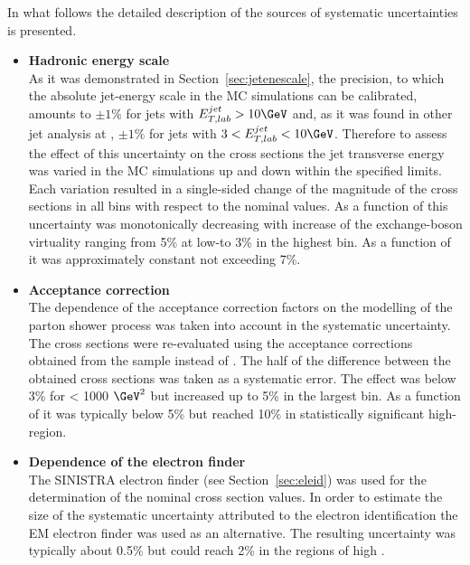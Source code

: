 In what follows the detailed description of the sources of systematic uncertainties is presented.
\begin{itemize}
	\item \textbf{Hadronic energy scale} \\
		As it was demonstrated in Section~\ref{sec:jetenescale}, the precision, to which the absolute jet-energy scale in the MC simulations can be calibrated, amounts to $\pm1\%$ for jets with $\etjetlab > 10 \GeV$ and, as it was found in other jet analysis at \zeus, $\pm1\%$ for jets with $3 < \etjetlab < 10 \GeV$. Therefore to assess the effect of this uncertainty on the cross sections the jet transverse energy was varied in the MC simulations up and down within the specified limits. Each variation resulted in a single-sided change of the magnitude of the cross sections in all bins with respect to the nominal values. As a function of \qsq this uncertainty was monotonically decreasing with increase of the exchange-boson virtuality ranging from 5\% at low-\qsq to 3\% in the highest \qsq bin. As a function of \etjetb it was approximately constant not exceeding 7\%.
		
	\item \textbf{Acceptance correction} \\
		The dependence of the acceptance correction factors on the modelling of the parton shower process was taken into account in the systematic uncertainty. The cross sections were re-evaluated using the acceptance corrections obtained from the \ariadne sample instead of \lepto. The half of the difference between the obtained cross sections was taken as a systematic error. The effect was below 3\% for \qsq < 1000 $\GeV^2$ but increased up to 5\% in the largest \qsq bin. As a function of \etjetb it was typically below 5\% but reached 10\% in statistically significant high-\etjetb region.
			
	\item \textbf{Dependence of the electron finder}\\
		The \textsc{SINISTRA} electron finder (see Section~\ref{sec:eleid}) was used for the determination of the nominal cross section values. In order to estimate the size of the systematic uncertainty attributed to the electron identification the \textsc{EM} electron finder was used as an alternative. The resulting uncertainty was typically about 0.5\% but could reach 2\% in the regions of high \qsq.
	

\end{itemize}
